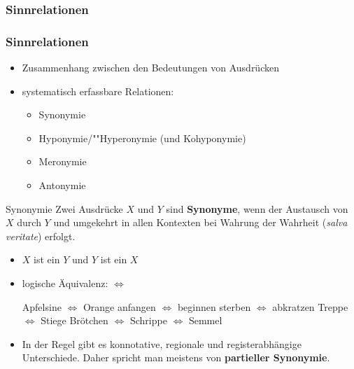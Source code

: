 %
\subsubsection{Sinnrelationen}
%

\begin{frame}
\frametitle{Sinnrelationen}

\begin{itemize}
	\item Zusammenhang zwischen den Bedeutungen von Ausdrücken
	\medskip
	\item systematisch erfassbare Relationen:
	
\vspace{5mm}
	
	\begin{itemize}
		\item Synonymie
		\medskip
		\item Hyponymie/""Hyperonymie (und Kohyponymie)
		\medskip	
		\item Meronymie
		\medskip
 		\item Antonymie
	\end{itemize}
	
\end{itemize}

\end{frame}



\begin{frame}

\begin{block}{Synonymie}
Zwei Ausdrücke $X$ und $Y$ sind \textbf{Synonyme}, wenn der Austausch von $X$ durch $Y$ und umgekehrt in allen Kontexten bei Wahrung der Wahrheit (\emph{salva veritate}) erfolgt.
\end{block}

\begin{itemize}
	\item $X$ ist ein $Y$ und $Y$ ist ein $X$
	\item logische Äquivalenz: $\Leftrightarrow$
	
	\eal
		\ex Apfelsine $\Leftrightarrow$ Orange
		\ex anfangen $\Leftrightarrow$ beginnen
		\ex sterben $\Leftrightarrow$ abkratzen
		\ex Treppe $\Leftrightarrow$ Stiege
		\ex Brötchen $\Leftrightarrow$ Schrippe $\Leftrightarrow$ Semmel
	\zl
	
	\item In der Regel gibt es konnotative, regionale und registerabhängige Unterschiede. Daher spricht man meistens von \textbf{partieller Synonymie}.
\end{itemize}

\end{frame}


